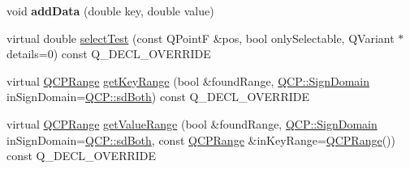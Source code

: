 \begin{DoxyCompactItemize}
\item 
void {\bfseries add\+Data} (double key, double value)\hypertarget{class_q_c_p_graph_a0bf98b1972286cfb7b1c4b7dd6ae2012}{}\label{class_q_c_p_graph_a0bf98b1972286cfb7b1c4b7dd6ae2012}

\item 
virtual double \hyperlink{class_q_c_p_graph_ab70a737dabcedbd4da4a0bc5a9cff60e}{select\+Test} (const Q\+PointF \&pos, bool only\+Selectable, Q\+Variant $\ast$details=0) const Q\+\_\+\+D\+E\+C\+L\+\_\+\+O\+V\+E\+R\+R\+I\+DE
\item 
virtual \hyperlink{class_q_c_p_range}{Q\+C\+P\+Range} \hyperlink{class_q_c_p_graph_a7b332af5ead6a278f4a6a065febeed24}{get\+Key\+Range} (bool \&found\+Range, \hyperlink{namespace_q_c_p_afd50e7cf431af385614987d8553ff8a9}{Q\+C\+P\+::\+Sign\+Domain} in\+Sign\+Domain=\hyperlink{namespace_q_c_p_afd50e7cf431af385614987d8553ff8a9a3dee7e9cd2fedce9253b83e172626a6c}{Q\+C\+P\+::sd\+Both}) const Q\+\_\+\+D\+E\+C\+L\+\_\+\+O\+V\+E\+R\+R\+I\+DE
\item 
virtual \hyperlink{class_q_c_p_range}{Q\+C\+P\+Range} \hyperlink{class_q_c_p_graph_a5c5b99a98bf81bc398dd46486eadb8e2}{get\+Value\+Range} (bool \&found\+Range, \hyperlink{namespace_q_c_p_afd50e7cf431af385614987d8553ff8a9}{Q\+C\+P\+::\+Sign\+Domain} in\+Sign\+Domain=\hyperlink{namespace_q_c_p_afd50e7cf431af385614987d8553ff8a9a3dee7e9cd2fedce9253b83e172626a6c}{Q\+C\+P\+::sd\+Both}, const \hyperlink{class_q_c_p_range}{Q\+C\+P\+Range} \&in\+Key\+Range=\hyperlink{class_q_c_p_range}{Q\+C\+P\+Range}()) const Q\+\_\+\+D\+E\+C\+L\+\_\+\+O\+V\+E\+R\+R\+I\+DE
\end{DoxyCompactItemize}
